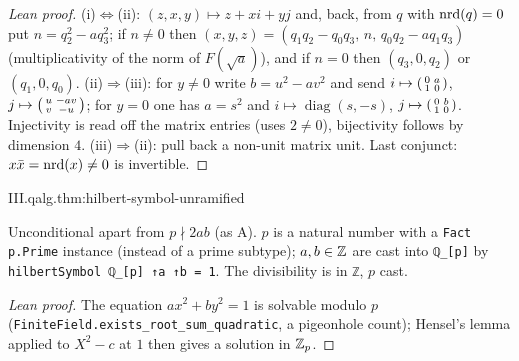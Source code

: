 \begin{proof}[Lean proof]
(i)$\iff$(ii): $(z,x,y)\mapsto z+xi+yj$ and, back, from $q$ with $\operatorname{nrd}(q)=0$ put $n=q_2^2-aq_3^2$; if $n\neq0$ then $(x,y,z)=(q_1q_2-q_0q_3,\,n,\,q_0q_2-aq_1q_3)$ (multiplicativity of the norm of $F(\sqrt a)$), and if $n=0$ then $(q_3,0,q_2)$ or $(q_1,0,q_0)$. (ii)$\Rightarrow$(iii): for $y\neq0$ write $b=u^2-av^2$ and send $i\mapsto\begin{psmallmatrix}0&a\\1&0\end{psmallmatrix}$, $j\mapsto\begin{psmallmatrix}u&-av\\v&-u\end{psmallmatrix}$; for $y=0$ one has $a=s^2$ and $i\mapsto\operatorname{diag}(s,-s)$, $j\mapsto\begin{psmallmatrix}0&b\\1&0\end{psmallmatrix}$. Injectivity is read off the matrix entries (uses $2\neq0$), bijectivity follows by dimension $4$. (iii)$\Rightarrow$(ii): pull back a non-unit matrix unit. Last conjunct: $x\bar x=\operatorname{nrd}(x)\neq0$ is invertible.
\end{proof}

\begin{theorem}
\end{theorem}
\begin{tfformal}{III.qalg.thm:hilbert-symbol-unramified}
\begin{tffidelity}
Unconditional apart from $p\nmid2ab$ (as A). $p$ is a natural number with a \texttt{Fact p.Prime} instance (instead of a prime subtype); $a,b\in\mathbb{Z}$ are cast into \texttt{ℚ\_[p]} by \texttt{hilbertSymbol ℚ\_[p] ↑a ↑b = 1}. The divisibility is in \texttt{ℤ}, $p$ cast.
\end{tffidelity}
\end{tfformal}
\begin{proof}[Lean proof]
The equation $ax^2+by^2=1$ is solvable modulo $p$ (\texttt{FiniteField.exists\_root\_sum\_quadratic}, a pigeonhole count); Hensel's lemma applied to $X^2-c$ at $1$ then gives a solution in $\mathbb{Z}_p$.
\end{proof}

